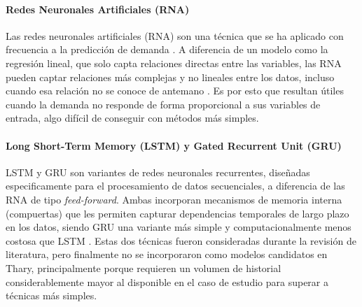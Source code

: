 \paragraph{Redes Neuronales Artificiales (RNA)}
Las redes neuronales artificiales (RNA) son una técnica que se ha aplicado con frecuencia a la predicción de demanda \cite{kochak2015demand}. A diferencia de un modelo como la regresión lineal, que solo capta relaciones directas entre las variables, las RNA pueden captar relaciones más complejas y no lineales entre los datos, incluso cuando esa relación no se conoce de antemano \cite{kochak2015demand}. Es por esto que resultan útiles cuando la demanda no responde de forma proporcional a sus variables de entrada, algo difícil de conseguir con métodos más simples.

\paragraph{Long Short-Term Memory (LSTM) y Gated Recurrent Unit (GRU)}
LSTM y GRU son variantes de redes neuronales recurrentes, diseñadas especificamente para el procesamiento de datos secuenciales, a diferencia de las RNA de tipo \textit{feed-forward}. Ambas incorporan mecanismos de memoria interna (compuertas) que les permiten capturar dependencias temporales de largo plazo en los datos, siendo GRU una variante más simple y computacionalmente menos costosa que LSTM \cite{10124729, Salem2022}. Estas dos técnicas fueron consideradas durante la revisión de literatura, pero finalmente no se incorporaron como modelos candidatos en Thary, principalmente porque requieren un volumen de historial considerablemente mayor al disponible en el caso de estudio para superar a técnicas más simples.




